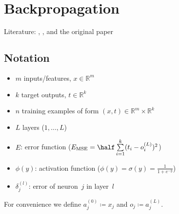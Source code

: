\section{Backpropagation}\label{sec:backpropagation}
Literature: \cite[Chapter 4.5]{Mitchell1997}, \cite[Chapter 6.3]{Duda2000}, \cite{Patterson1997} and the original paper \cite{Rumelhart1986}

\subsection{Notation}
\begin{itemize}
\item $m$ inputs/features, $x \in \mathbb{R}^m$
\item $k$ target outputs, $t \in \mathbb{R}^k$
\item $n$ training examples of form $(x, t) \in \mathbb{R}^m \times \mathbb{R}^k$
\item $L$ layers ($1,\dots,L$)
\item $E$: error function (\eg $E_{\text{MSE}} = \half \sum\limits_{i=1}^k (t_i - o_i^{(L)})^2$)
\item $\phi(y)$: activation function (\eg $\phi(y) = \sigma(y) = \frac{1}{1 + e^{-y}}$)
\item $\delta_j^{(l)}$: error of neuron~$j$ in layer~$l$
\end{itemize}

For convenience we define $a_j^{(0)}\coloneqq x_j$ and $o_j\coloneqq a_j^{(L)}$.

